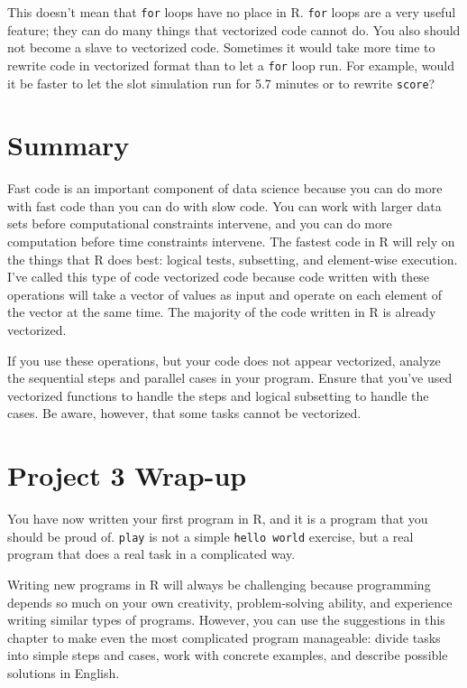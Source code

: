 \documentclass[
  letterpaper,
  DIV=11,
  numbers=noendperiod]{scrbook}
\begin{document}
This doesn't mean that \texttt{for} loops have no place in R.
\texttt{for} loops are a very useful feature; they can do many things
that vectorized code cannot do. You also should not become a slave to
vectorized code. Sometimes it would take more time to rewrite code in
vectorized format than to let a \texttt{for} loop run. For example,
would it be faster to let the slot simulation run for 5.7 minutes or to
rewrite \texttt{score}?

\section{Summary}\label{summary-9}

Fast code is an important component of data science because you can do
more with fast code than you can do with slow code. You can work with
larger data sets before computational constraints intervene, and you can
do more computation before time constraints intervene. The fastest code
in R will rely on the things that R does best: logical tests,
subsetting, and element-wise execution. I've called this type of code
vectorized code because code written with these operations will take a
vector of values as input and operate on each element of the vector at
the same time. The majority of the code written in R is already
vectorized.

If you use these operations, but your code does not appear vectorized,
analyze the sequential steps and parallel cases in your program. Ensure
that you've used vectorized functions to handle the steps and logical
subsetting to handle the cases. Be aware, however, that some tasks
cannot be vectorized.

\section{Project 3 Wrap-up}\label{project-3-wrap-up}

You have now written your first program in R, and it is a program that
you should be proud of. \texttt{play} is not a simple
\texttt{hello\ world} exercise, but a real program that does a real task
in a complicated way.

Writing new programs in R will always be challenging because programming
depends so much on your own creativity, problem-solving ability, and
experience writing similar types of programs. However, you can use the
suggestions in this chapter to make even the most complicated program
manageable: divide tasks into simple steps and cases, work with concrete
examples, and describe possible solutions in English.
\end{document}
